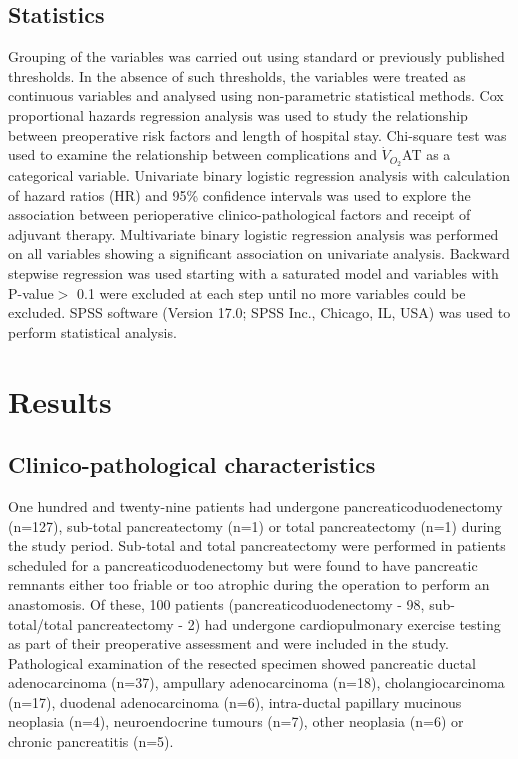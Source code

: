 \subsection{Statistics}
Grouping of the variables was carried out using standard or previously published thresholds. 
In the absence of such thresholds, the variables were treated as continuous variables and analysed using non-parametric statistical methods. 
Cox proportional hazards regression analysis was used to study the relationship between preoperative risk factors and length of hospital stay. 
Chi-square test was used to examine the relationship between complications and $\dot{V}_{O_2}$AT as a categorical variable. 
Univariate binary logistic regression analysis with calculation of hazard ratios (HR) and 95\% confidence intervals was used to explore the association between perioperative clinico-pathological factors and receipt of adjuvant therapy. 
Multivariate binary logistic regression analysis was performed on all variables showing a significant association on univariate analysis. 
Backward stepwise regression was used starting with a saturated model and variables with P-value$>$  0.1 were excluded at each step until no more variables could be excluded. 
SPSS software (Version 17.0; SPSS Inc., Chicago, IL, USA) was used to perform statistical analysis.

\clearpage

\section{Results}

\subsection{Clinico-pathological characteristics}
One hundred and twenty-nine patients had undergone pancreaticoduodenectomy (n=127), sub-total pancreatectomy (n=1) or total pancreatectomy (n=1) during the study period. 
Sub-total and total pancreatectomy were performed in patients scheduled for a pancreaticoduodenectomy but were found to have pancreatic remnants either too friable or too atrophic during the operation to perform an anastomosis. 
Of these, 100 patients (pancreaticoduodenectomy - 98, sub-total/total pancreatectomy - 2) had undergone cardiopulmonary exercise testing as part of their preoperative assessment and were included in the study. 
Pathological examination of the resected specimen showed pancreatic ductal adenocarcinoma (n=37), ampullary adenocarcinoma (n=18), cholangiocarcinoma (n=17), duodenal adenocarcinoma (n=6), intra-ductal papillary mucinous neoplasia (n=4), neuroendocrine tumours (n=7), other neoplasia (n=6) or chronic pancreatitis (n=5).

